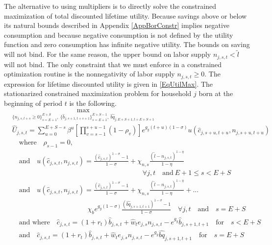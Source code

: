 \documentclass[letterpaper,12pt]{article}
\theoremstyle{definition}
\begin{document}
  The alternative to using multipliers is to directly solve the constrained maximization of total discounted lifetime utility. Because savings above or below its natural bounds described in Appendix \ref{AppBorConstr} implies negative consumption and because negative consumption is not defined by the utility function and zero consumption has infinite negative utility. The bounds on saving will not bind. For the same reason, the upper bound on labor supply $n_{j,s,t}<\tilde{l}$ will not bind. The only constraint that we must enforce in a constrained optimization routine is the nonnegativity of labor supply $n_{j,s,t}\geq 0$. The expression for lifetime discounted utility is given in \eqref{EqUtilMax}. The stationarized constrained maximization problem for household $j$ born at the beginning of period $t$ is the following.
  \begin{equation}\label{EqLifeUtilConstrMax}
    \begin{split}
      &\max_{\{n_{j,s,t+s}\geq 0\}_{s=E+1}^{E+S},\:\{\hat{b}_{j,s+1,t+s+1}\}_{s=E+1}^{E+S-1},\:\hat{bq}_{j,E+S+1,t+E+S+1}} \\
      &\hat{U}_{j,s,t} = \sum_{u=0}^{E+S-s}\beta^u\left[\prod_{v=s-1}^{s+u-1}(1-\rho_v)\right]e^{g_y(t+u)(1-\sigma)}u\left(\hat{c}_{j,s+u,t+u},n_{j,s+u,t+u}\right) \\
      &\quad\text{where}\quad \rho_{s-1}=0, \\
      &\quad\text{and} \quad u\left(\hat{c}_{j,s,t},n_{j,s,t}\right) = \frac{\left(\hat{c}_{j,s,t}\right)^{1-\sigma} - 1}{1-\sigma} + \chi_{n,s}\frac{(\tilde{l}-n_{j,s,t})^{1-\eta}}{1-\eta} \\
      &\quad\quad\quad\quad\quad\quad\quad\quad\quad\quad\quad\quad\quad\quad\quad\quad\quad\quad\quad\forall j,t\quad\text{and}\:E+1\leq s< E+S \\
      &\quad\text{and}\quad u\left(\hat{c}_{j,s,t},n_{j,s,t}\right) = \frac{\left(\hat{c}_{j,s,t}\right)^{1-\sigma} - 1}{1-\sigma} + \chi_{n,s}\frac{(\tilde{l}-n_{j,s,t})^{1-\eta}}{1-\eta} + ... \\
      &\quad\quad\quad\quad\quad\quad\quad\quad\quad\quad\quad \chi_b e^{g_y(1-\sigma)}\frac{\left(\hat{bq}_{j,s+1,t+1}\right)^{1-\sigma} - 1}{1-\sigma} \quad\forall j,t\quad\text{and}\quad s=E+S \\
      &\quad\text{and where}\quad \hat{c}_{j,s,t} = (1+r_t)\hat{b}_{j,s,t} + \hat{w}_t e_{j,s}n_{j,s,t} - e^{g_y}\hat{b}_{j,s+1,t+1} \quad\text{for}\quad s<E+S \\
      &\quad\text{and}\quad \hat{c}_{j,s,t} = (1+r_t)\hat{b}_{j,s,t} + \hat{w}_t e_{j,s}n_{j,s,t} - e^{g_y}\hat{bq}_{j,s+1,t+1} \quad\text{for}\quad s=E+S
    \end{split}
  \end{equation}
\end{document}
